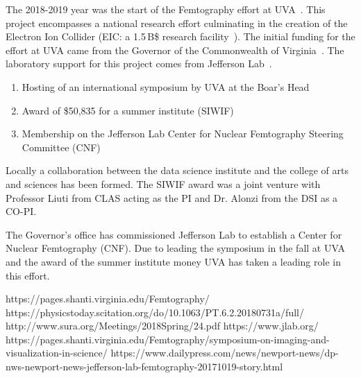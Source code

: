 The 2018-2019 year was the start of the Femtography effort at UVA~\cite{ref:siwif}. This project encompasses a national research effort culminating in the creation of the Electron Ion Collider (EIC: a 1.5\,B\$ research facility~\cite{ref:eic}). The initial funding for the effort at UVA came from the Governor of the Commonwealth of Virginia~\cite{ref:cnf}. The laboratory support for this project comes from Jefferson Lab~\cite{ref:jlab}.

\begin{enumerate}
\item Hosting of an international symposium by UVA at the Boar's Head~\cite{ref:symp}
\item Award of \$50,835 for a summer institute (SIWIF)
\item Membership on the Jefferson Lab Center for Nuclear Femtography Steering Committee (CNF)
\end{enumerate}

Locally a collaboration between the data science institute and the college of arts and sciences has been formed. The SIWIF award was a joint venture with Professor Liuti from CLAS acting as the PI and Dr. Alonzi from the DSI as a CO-PI.

The Governor's office has commissioned Jefferson Lab to establish a Center for Nuclear Femtography (CNF). Due to leading the symposium in the fall at UVA and the award of the summer institute money UVA has taken a leading role in this effort.

\pagebreak

\begin{thebibliography}{99}
 https://pages.shanti.virginia.edu/Femtography/
 https://physicstoday.scitation.org/do/10.1063/PT.6.2.20180731a/full/
 http://www.sura.org/Meetings/2018Spring/24.pdf
 https://www.jlab.org/
 https://pages.shanti.virginia.edu/Femtography/symposium-on-imaging-and-visualization-in-science/
 https://www.dailypress.com/news/newport-news/dp-nws-newport-news-jefferson-lab-femtography-20171019-story.html
\end{thebibliography}
